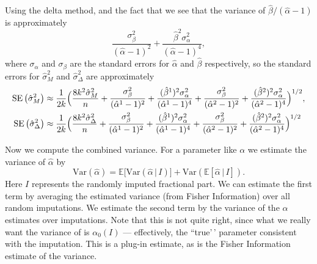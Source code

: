 \documentclass[
]{article}
\begin{document}
Using the delta method, and the fact that we see that the variance of \(\hat\beta/(\hat\alpha-1)\) is approximately
\[
  \frac{\sigma_\beta^2}{(\hat\alpha-1)^2} + \frac{\hat\beta^2\sigma_\alpha^2}{(\hat\alpha-1)^4},
\]
where \(\sigma_\alpha\) and \(\sigma_\beta\) are the standard errors for \(\hat\alpha\) and \(\hat\beta\) respectively, so the standard errors for \(\hat\sigma_M^2\) and \(\hat\sigma_\Delta^2\) are approximately
\begin{align*}
  \operatorname{SE}\left(\hat\sigma_M^2\right)&\approx \frac{1}{2k}\Bigl(\frac{8k^2\hat\sigma_M^2}{n} + \frac{\sigma_\beta^2}{(\hat\alpha^1-1)^2} + \frac{(\hat\beta^1)^2\sigma_\alpha^2}{(\hat\alpha^1-1)^4} + \frac{\sigma_\beta^2}{(\hat\alpha^2-1)^2} + \frac{(\hat\beta^2)^2\sigma_\alpha^2}{(\hat\alpha^2-1)^4} \Bigr)^{1/2},\\
  \operatorname{SE}\left(\hat\sigma_\Delta^2\right)&\approx \frac{1}{2k}\Bigl(\frac{8k^2\hat\sigma_\Delta^2}{n} + \frac{\sigma_\beta^2}{(\hat\alpha^1-1)^2} + \frac{(\hat\beta^1)^2\sigma_\alpha^2}{(\hat\alpha^1-1)^4} + \frac{\sigma_\beta^2}{(\hat\alpha^2-1)^2} + \frac{(\hat\beta^2)^2\sigma_\alpha^2}{(\hat\alpha^2-1)^4} \Bigr)^{1/2}
\end{align*}

Now we compute the combined variance. For a parameter like \(\alpha\) we estimate the variance of \(\hat\alpha\) by
\newcommand{\E}{\mathbb{E}}
\renewcommand{\P}{\mathbb{P}}
\[
  \mathrm{Var}(\hat\alpha) = \mathbb{E}\bigl[ \mathrm{Var}\left(\hat\alpha\, |\, I\right)\bigr] + \mathrm{Var}\left(\mathbb{E} \left[ \hat\alpha\, |\, I \right]\right).
\]
Here \(I\) represents the randomly imputed fractional part.
We can estimate the first term by averaging the estimated variance (from Fisher Information) over all random imputations.
We estimate the second term by the variance of the \(\alpha\) estimates over imputations. Note that this is not quite right, since what we really
want the variance of is \(\alpha_0(I)\) --- effectively, the ``true'\,' parameter consistent with the imputation. This is a plug-in estimate,
as is the Fisher Information estimate of the variance.
\end{document}
